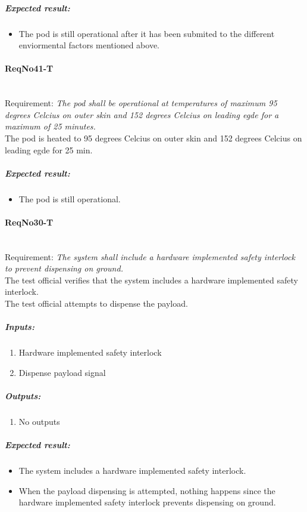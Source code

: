 	\subparagraph{Expected result:}
	\begin{itemize}
	\item The pod is still operational after it has been submited to the different
	enviormental factors mentioned above.
	\end{itemize}



\paragraph{ReqNo41-T}\mbox{}\\ %
Requirement: \textit{The pod shall be operational at temperatures of maximum 95 degrees Celcius on outer skin and 152 degrees Celcius on leading egde for a maximum of 25 minutes.}\\

The pod is heated to 95 degrees Celcius on outer skin and 152 degrees Celcius on leading egde for 25 min. 

	\subparagraph{Expected result:}
	\begin{itemize}
	\item The pod is still operational.
	\end{itemize}

\paragraph{ReqNo30-T}\mbox{}\\ %
Requirement: \textit{The system shall include a hardware implemented safety interlock to prevent dispensing on ground.}\\

The test official verifies that the system includes a hardware implemented safety interlock. \\
The test official attempts to dispense the payload.  
\subparagraph{Inputs:}
	\begin{enumerate}
	\item Hardware implemented safety interlock
	\item Dispense payload signal
	\end{enumerate}
\subparagraph{Outputs:}
	\begin{enumerate}
	\item No outputs
	\end{enumerate}
\subparagraph{Expected result:}
	\begin{itemize}
	\item The system includes a hardware implemented safety interlock.
	\item When the payload dispensing is attempted, nothing happens since the hardware implemented safety interlock prevents dispensing on ground.
	\end{itemize}


